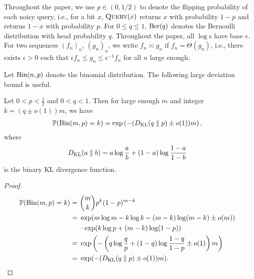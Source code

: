 Throughout the paper, we use $p \in (0, 1/2)$ to denote the flipping probability of each noisy query, i.e., for a bit $x$, $\textsc{Query}(x)$ returns $x$ with probability $1-p$ and returns $1 - x$ with probability $p$. For $0 \le q \le 1$, $\operatorname{\mathrm{Ber}}(q)$ denotes the Bernoulli distribution with head probability $q$.
Throughout the paper, all $\log$s have base $e$.
For two sequences $(f_n)_n$, $(g_n)_n$, we write $f_n \asymp g_n$ if $f_n = \Theta(g_n)$, i.e., there exists $\epsilon>0$ such that $\epsilon f_n \le g_n \le \epsilon^{-1} f_n$ for all $n$ large enough.

Let $\operatorname{\mathrm{Bin}}(n,p)$ denote the binomial distribution. The following large deviation bound is useful.
\begin{lemma} \label{lem:binomial-large-deviation}
  Let $0<p<\frac 12$ and $0<q<1$.
  Then for large enough $m$ and integer $k = (q\pm o(1)) m$, we have
  \begin{align*}
    \mathbb{P}(\operatorname{\mathrm{Bin}}(m, p) = k) = \exp\left(-(D_{\operatorname{\mathrm{KL}}}(q \parallel p) \pm o(1)) m\right),
  \end{align*}
  where
  \begin{align*}
    D_{\operatorname{\mathrm{KL}}}(a \parallel b) = a \log \frac ab + (1-a) \log \frac{1-a}{1-b}
  \end{align*}
  is the binary KL divergence function.
\end{lemma}
\begin{proof}
  \begin{align*}
    \mathbb{P}(\operatorname{\mathrm{Bin}}(m, p) = k) =&~ \binom mk p^k (1-p)^{m-k} \\
    \nonumber =&~ \exp(m \log m - k \log k - (m-k) \log (m-k) \pm o(m)) \\
    \nonumber &~\cdot \exp(k \log p + (m-k) \log (1-p))\\
    \nonumber =&~ \exp\left( -\left(q \log \frac{q}{p} + (1-q) \log \frac{1-q}{1-p} \pm o(1)\right) m\right) \\
    \nonumber =&~ \exp(-(D_{\operatorname{\mathrm{KL}}}(q \parallel p) \pm o(1)) m).
  \end{align*}
\end{proof}
